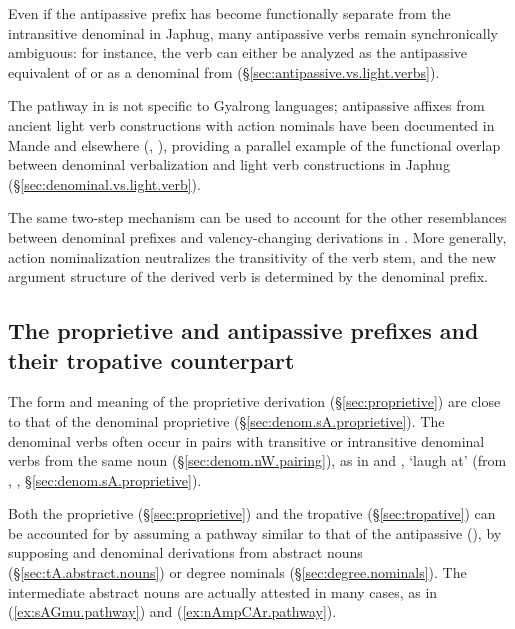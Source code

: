 Even if the antipassive prefix has become functionally separate from the intransitive denominal  in Japhug, many antipassive verbs remain synchronically ambiguous: for instance, the verb  can either be analyzed as the antipassive equivalent of  or as a denominal from   (§\ref{sec:antipassive.vs.light.verbs}).

The pathway in   is not specific to Gyalrong languages;  antipassive affixes from ancient light verb constructions with action nominals have been documented in Mande and elsewhere (\citealt{creissels12antip}, \citealt{sanso17antipassive}), providing a parallel example of the functional overlap between denominal verbalization and light verb constructions in Japhug (§\ref{sec:denominal.vs.light.verb}).

The same two-step mechanism can be used to account for the other resemblances between denominal prefixes and valency-changing derivations  in . More generally,  action nominalization neutralizes the transitivity of the verb stem, and the new argument structure of the derived verb is determined by the denominal prefix.
  
\subsection{The proprietive and antipassive  prefixes and their tropative counterpart} \label{sec:sA.history} 
The form and meaning of the proprietive  derivation (§\ref{sec:proprietive}) are close to that of the denominal proprietive  (§\ref{sec:denom.sA.proprietive}). The  denominal verbs often occur in pairs with transitive or intransitive   denominal verbs from the same noun (§\ref{sec:denom.nW.pairing}), as in  and , `laugh at' (from , , §\ref{sec:denom.sA.proprietive}).

Both the proprietive  (§\ref{sec:proprietive}) and the tropative  (§\ref{sec:tropative}) can be accounted for by assuming a pathway similar to that of the antipassive (), by supposing  and  denominal derivations from abstract nouns (§\ref{sec:tA.abstract.nouns}) or degree nominals (§\ref{sec:degree.nominals}). The intermediate abstract nouns are actually attested in many cases, as in (\ref{ex:sAGmu.pathway}) and (\ref{ex:nAmpCAr.pathway}).
 
